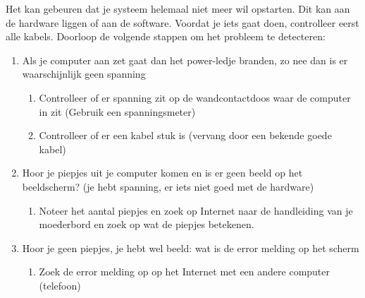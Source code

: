 Het kan gebeuren dat je systeem helemaal niet meer wil opstarten. Dit kan aan de hardware liggen of aan de software. Voordat je iets gaat doen, controlleer eerst alle kabels. Doorloop de volgende stappen om het probleem te detecteren:
\begin{enumerate}
\item Als je computer aan zet gaat dan het power-ledje branden, zo nee dan is er waarschijnlijk geen spanning
	\begin{enumerate}
	\item Controlleer of er spanning zit op de wandcontactdoos waar de computer in zit (Gebruik een spanningsmeter)
	\item Controlleer of er een kabel stuk is (vervang door een bekende goede kabel)
	\end{enumerate}
\item Hoor je piepjes uit je computer komen en is er geen beeld op het beeldscherm? (je hebt spanning, er iets niet goed met de hardware)
	\begin{enumerate}
	\item Noteer het aantal piepjes en zoek op Internet naar de handleiding van je moederbord en zoek op wat de piepjes betekenen.
	\end{enumerate}
\item Hoor je geen piepjes, je hebt wel beeld: wat is de error melding op het scherm
	\begin{enumerate}
	\item Zoek de error melding op op het Internet met een andere computer (telefoon)
	\end{enumerate}
\end{enumerate}

